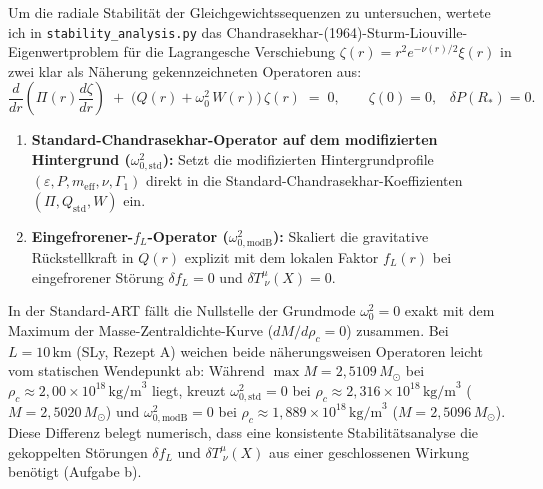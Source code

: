 \documentclass[10pt,a4paper]{article}
\begin{document}
\par
Um die radiale Stabilit\"at der Gleichgewichtssequenzen zu untersuchen, wertete ich in \texttt{stability\_analysis.py} das Chandrasekhar-(1964)-Sturm-Liouville-Eigenwertproblem f\"ur die Lagrangesche Verschiebung $\zeta(r) = r^2 e^{-\nu(r)/2}\xi(r)$ in zwei klar als N\"aherung gekennzeichneten Operatoren aus:
\begin{equation}
  \frac{d}{dr}\!\left(\Pi(r)\frac{d\zeta}{dr}\right) \;+\; \bigl(Q(r) + \omega_0^2\,W(r)\bigr)\,\zeta(r) \;=\; 0, \qquad
  \zeta(0)=0,\;\;\;\delta P(R_*)=0.
\end{equation}
\begin{enumerate}\setlength{\itemsep}{1pt}\setlength{\parskip}{0pt}\setlength{\topsep}{1pt}
  \item \textbf{Standard-Chandrasekhar-Operator auf dem modifizierten Hintergrund ($\omega_{0,\text{std}}^2$):} Setzt die modifizierten Hintergrundprofile $(\varepsilon, P, m_{\text{eff}}, \nu, \Gamma_1)$ direkt in die Standard-Chandrasekhar-Koeffizienten $(\Pi, Q_{\text{std}}, W)$ ein.
  \item \textbf{Eingefrorener-$f_L$-Operator ($\omega_{0,\text{modB}}^2$):} Skaliert die gravitative R\"uckstellkraft in $Q(r)$ explizit mit dem lokalen Faktor $f_L(r)$ bei eingefrorener St\"orung $\delta f_L = 0$ und $\delta T^\mu_{\;\nu}(X) = 0$.
\end{enumerate}

\par
In der Standard-ART f\"allt die Nullstelle der Grundmode $\omega_0^2 = 0$ exakt mit dem Maximum der Masse-Zentraldichte-Kurve ($dM/d\rho_c = 0$) zusammen. Bei $L = 10\,\text{km}$ (SLy, Rezept A) weichen beide n\"aherungsweisen Operatoren leicht vom statischen Wendepunkt ab: W\"ahrend $\max M = 2{,}5109\,M_\odot$ bei $\rho_c \approx 2{,}00\times 10^{18}\,\text{kg/m}^3$ liegt, kreuzt $\omega_{0,\text{std}}^2 = 0$ bei $\rho_c \approx 2{,}316\times 10^{18}\,\text{kg/m}^3$ ($M = 2{,}5020\,M_\odot$) und $\omega_{0,\text{modB}}^2 = 0$ bei $\rho_c \approx 1{,}889\times 10^{18}\,\text{kg/m}^3$ ($M = 2{,}5096\,M_\odot$). Diese Differenz belegt numerisch, dass eine konsistente Stabilit\"atsanalyse die gekoppelten St\"orungen $\delta f_L$ und $\delta T^\mu_{\;\nu}(X)$ aus einer geschlossenen Wirkung ben\"otigt (Aufgabe b).
\end{document}
